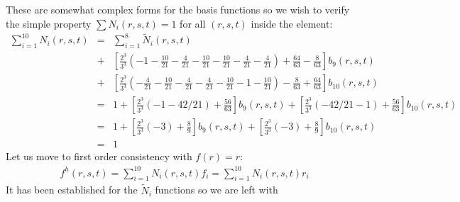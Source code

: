 These are somewhat complex forms for the basis functions so we wish to verify the simple property $\sum N_i(r,s,t) =1$ for all $(r,s,t)$ inside the element:
\begin{eqnarray}
\sum_{i=1}^{10} N_i(r,s,t)  
&=& \sum_{i=1}^{8} \tilde{N}_i(r,s,t) \nonumber\\
&+& \left[\frac{2^3}{3^3} \left(-1 -\frac{10}{21} -\frac{4}{21} -\frac{10}{21} -\frac{10}{21} -\frac{4}{21} -\frac{4}{21}\right) + \frac{64}{63} -\frac{8}{63} \right] b_9(r,s,t) \nonumber\\
&+& \left[\frac{2^3}{3^3} \left(-\frac{4}{21} -\frac{10}{21} -\frac{4}{21} -\frac{4}{21} -\frac{10}{21} -1 -\frac{10}{21} \right) -\frac{8}{63} + \frac{64}{63} \right] b_{10}(r,s,t) \nonumber\\
&=& 1 + \left[\frac{2^3}{3^3} (-1 -42/21) +\frac{56}{63}  \right] b_9(r,s,t) 
+ \left[\frac{2^3}{3^3} (-42/21 -1)  + \frac{56}{63} \right] b_{10}(r,s,t) \nonumber\\
&=& 1 + \left[\frac{2^3}{3^3} (-3) + \frac{8}{9} \right] b_9(r,s,t) 
+ \left[\frac{2^3}{3^3} (-3)  + \frac{8}{9} \right] b_{10}(r,s,t) \nonumber\\
&=& 1
\end{eqnarray}
Let us move to first order consistency with $f(r)=r$:
\begin{eqnarray}
f^h(r,s,t)
=\sum_{i=1}^{10} N_i(r,s,t) f_i
=\sum_{i=1}^{10} N_i(r,s,t) r_i 
\end{eqnarray}
It has been established for the $\tilde{N}_i$ functions so we are left with
